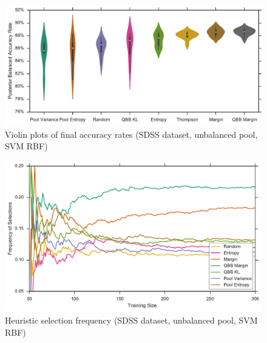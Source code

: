 \begin{figure}[p]
	\centering
	\includegraphics[width=\textwidth]{figures/5_active/sdss_ur_ind_violin}
	\caption[Violin plots of final accuracy rates (SDSS, unbalanced, SVM RBF)]{
		Violin plots of final accuracy rates (SDSS dataset, unbalanced pool, SVM RBF)}
	\label{fig:sdss_ur_ind_violin}
\end{figure}

\begin{figure}[p]
	\centering
	\includegraphics[width=\textwidth]{figures/5_thompson/sdss_ur_frequencies}
	\caption[Heuristic selection frequency (SDSS, unbalanced, SVM RBF)]{
		Heuristic selection frequency (SDSS dataset, unbalanced pool, SVM RBF)}
	\label{fig:sdss_ur_frequencies}
\end{figure}

